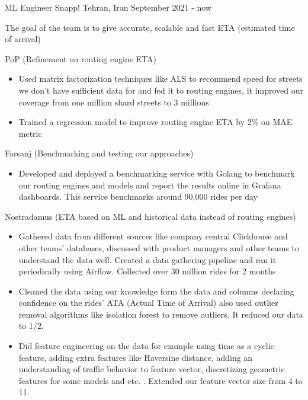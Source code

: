\begin{cventries}
  \cventry
    {ML Engineer} %
    {Snapp!} %
    {Tehran, Iran} %
    {September 2021 - now} %
    {
      \begin{cvitems} %
        \item The goal of the team is to give accurate, scalable and fast ETA (estimated time of arrival)
        \item PoP (Refinement on routing engine ETA)
        \begin{itemize}
          \item Used matrix factorization techniques like ALS to recommend speed for streets we don't have sufficient data for and fed it to routing engines, it improved our coverage from one million shard streets to 3 millions
          \item Trained a regression model to improve routing engine ETA by 2\% on MAE metric
        \end{itemize}
        \item Farsanj (Benchmarking and testing our approaches)
        \begin{itemize}
          \item Developed and deployed a benchmarking service with Golang to benchmark our routing engines and models and report the results online in Grafana dashboards. This service benchmarks around 90,000 rides per day
        \end{itemize}
        \item Nostradamus (ETA based on ML and historical data instead of routing engines)
        \begin{itemize}
          \item Gathered data from different sources like company central Clickhouse and other teams' databases, discussed with product managers and other teams to understand the data well. Created a data gathering pipeline and ran it periodically using Airflow. Collected over 30 million rides for 2 months
          \item Cleaned the data using our knowledge form the data and columns declaring confidence on the rides' ATA (Actual Time of Arrival) also used outlier removal algorithms like isolation forest to remove outliers. It reduced our data to 1/2.
          \item Did feature engineering on the data for example using time as a cyclic feature, adding extra features like Haversine distance, adding an understanding of traffic behavior to feature vector, discretizing geometric features for some models and etc. . Extended our feature vector size from 4 to 11.

\end{itemize}
\end{cvitems}}
\end{cventries}
